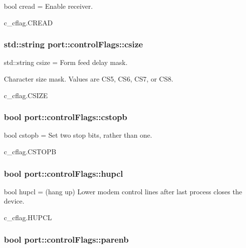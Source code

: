 bool cread = Enable receiver. 

c\+\_\+cflag.\+C\+R\+E\+AD
\subsubsection[{\texorpdfstring{csize}{csize}}]{\setlength{\rightskip}{0pt plus 5cm}std\+::string port\+::control\+Flags\+::csize}\hypertarget{classport_1_1controlFlags_a39ce003580b2d56b84309cd390b03032}{}\label{classport_1_1controlFlags_a39ce003580b2d56b84309cd390b03032}


std\+::string csize = Form feed delay mask. 

Character size mask. Values are C\+S5, C\+S6, C\+S7, or C\+S8. 

c\+\_\+cflag.\+C\+S\+I\+ZE
\subsubsection[{\texorpdfstring{cstopb}{cstopb}}]{\setlength{\rightskip}{0pt plus 5cm}bool port\+::control\+Flags\+::cstopb}\hypertarget{classport_1_1controlFlags_a0d87b6aea74b52992afe31351a741be2}{}\label{classport_1_1controlFlags_a0d87b6aea74b52992afe31351a741be2}


bool cstopb = Set two stop bits, rather than one. 

c\+\_\+cflag.\+C\+S\+T\+O\+PB
\subsubsection[{\texorpdfstring{hupcl}{hupcl}}]{\setlength{\rightskip}{0pt plus 5cm}bool port\+::control\+Flags\+::hupcl}\hypertarget{classport_1_1controlFlags_a389ac9dccd386fa6b69347780b3c068e}{}\label{classport_1_1controlFlags_a389ac9dccd386fa6b69347780b3c068e}


bool hupcl = (hang up) Lower modem control lines after last process closes the device. 

c\+\_\+cflag.\+H\+U\+P\+CL
\subsubsection[{\texorpdfstring{parenb}{parenb}}]{\setlength{\rightskip}{0pt plus 5cm}bool port\+::control\+Flags\+::parenb}\hypertarget{classport_1_1controlFlags_af3c39480a9de7dd42a34d282ca73cdee}{}\label{classport_1_1controlFlags_af3c39480a9de7dd42a34d282ca73cdee}


